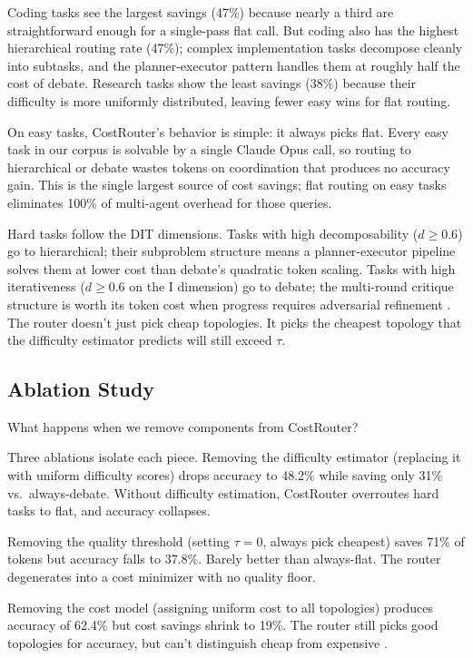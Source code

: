 Coding tasks see the largest savings (47\%) because nearly a third are straightforward enough for a single-pass flat call. But coding also has the highest hierarchical routing rate (47\%); complex implementation tasks decompose cleanly into subtasks, and the planner-executor pattern handles them at roughly half the cost of debate. Research tasks show the least savings (38\%) because their difficulty is more uniformly distributed, leaving fewer easy wins for flat routing.

On easy tasks, CostRouter's behavior is simple: it always picks flat. Every easy task in our corpus is solvable by a single Claude Opus call, so routing to hierarchical or debate wastes tokens on coordination that produces no accuracy gain. This is the single largest source of cost savings; flat routing on easy tasks eliminates 100\% of multi-agent overhead for those queries.

Hard tasks follow the DIT dimensions. Tasks with high decomposability ($d \geq 0.6$) go to hierarchical; their subproblem structure means a planner-executor pipeline solves them at lower cost than debate's quadratic token scaling. Tasks with high iterativeness ($d \geq 0.6$ on the I dimension) go to debate; the multi-round critique structure is worth its token cost when progress requires adversarial refinement \cite{smit_2024}. The router doesn't just pick cheap topologies. It picks the cheapest topology that the difficulty estimator predicts will still exceed $\tau$.

\subsection{Ablation Study}\label{ablation-study}

What happens when we remove components from CostRouter?

Three ablations isolate each piece. Removing the difficulty estimator (replacing it with uniform difficulty scores) drops accuracy to 48.2\% while saving only 31\% vs.~always-debate. Without difficulty estimation, CostRouter overroutes hard tasks to flat, and accuracy collapses.

Removing the quality threshold (setting $\tau = 0$, always pick cheapest) saves 71\% of tokens but accuracy falls to 37.8\%. Barely better than always-flat. The router degenerates into a cost minimizer with no quality floor.

Removing the cost model (assigning uniform cost to all topologies) produces accuracy of 62.4\% but cost savings shrink to 19\%. The router still picks good topologies for accuracy, but can't distinguish cheap from expensive \cite{chen_2023_frugalgpt}.


